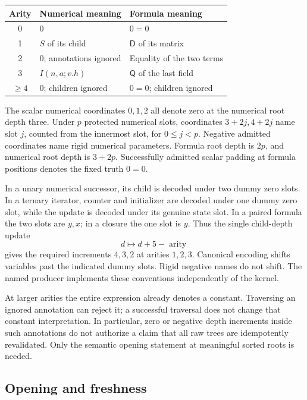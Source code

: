 \documentclass[11pt,letterpaper]{article}
\theoremstyle{definition}\newtheorem{definition}[theorem]{Definition}
\theoremstyle{remark}\newtheorem{remark}[theorem]{Remark}
\newcommand{\D}{\mathsf D}
\newcommand{\Q}{\mathsf Q}
\begin{document}
\begin{center}
\begin{tabular}{cll}
\toprule
Arity & Numerical meaning & Formula meaning\\
\midrule
0 & $0$ & $0=0$\\
1 & $S$ of its child & $\D$ of its matrix\\
2 & $0$; annotations ignored & Equality of the two terms\\
3 & $I(n,a;v.h)$ & $\Q$ of the last field\\
$\geq4$ & $0$; children ignored & $0=0$; children ignored\\
\bottomrule
\end{tabular}
\end{center}

The scalar numerical coordinates $0,1,2$ all denote zero at the
numerical root depth three. Under $p$ protected numerical slots,
coordinates $3+2j,4+2j$ name slot $j$, counted from the innermost slot,
for $0\leq j<p$. Negative admitted coordinates name rigid numerical
parameters. Formula root depth is $2p$, and numerical root depth is
$3+2p$. Successfully admitted scalar padding at formula positions denotes
the fixed truth $0=0$.

In a unary numerical successor, its child is decoded under two dummy
zero slots. In a ternary iterator, counter and initializer are decoded
under one dummy zero slot, while the update is decoded under its genuine
state slot. In a paired formula the two slots are $y,x$; in a closure
the one slot is $y$. Thus the single child-depth update
\[
                    d\longmapsto d+5-\operatorname{arity}
\]
gives the required increments $4,3,2$ at arities $1,2,3$.
Canonical encoding shifts variables past the indicated dummy slots.
Rigid negative names do not shift. The named producer implements these
conventions independently of the kernel.

At larger arities the entire expression already denotes a constant.
Traversing an ignored annotation can reject it; a successful traversal
does not change that constant interpretation. In particular, zero or
negative depth increments inside such annotations do not authorize a
claim that all raw trees are idempotently revalidated. Only the semantic
opening statement at meaningful sorted roots is needed.

\subsection{Opening and freshness}
\end{document}
